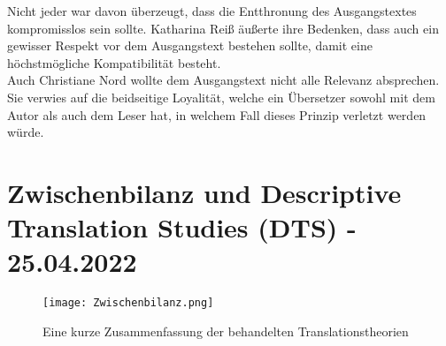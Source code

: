 \documentclass{article}
\begin{document}
	Nicht jeder war davon überzeugt, dass die Entthronung des Ausgangstextes kompromisslos sein sollte. Katharina Reiß äußerte ihre Bedenken, dass auch ein gewisser Respekt vor dem Ausgangstext bestehen sollte, damit eine höchstmögliche Kompatibilität besteht. \\
	Auch Christiane Nord wollte dem Ausgangstext nicht alle Relevanz absprechen. Sie verwies auf die beidseitige Loyalität, welche ein Übersetzer sowohl mit dem Autor als auch dem Leser hat, in welchem Fall dieses Prinzip verletzt werden würde. \\
	
	\section{Zwischenbilanz und Descriptive Translation Studies (DTS) - 25.04.2022}
	\begin{figure}[H]
		\centering
		\texttt{[image: Zwischenbilanz.png]}
		\caption{Eine kurze Zusammenfassung der behandelten Translationstheorien}
	\end{figure}
	\newpage
\end{document}
